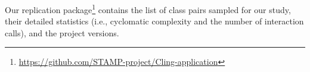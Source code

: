 Our replication package\footnote{\url{https://github.com/STAMP-project/Cling-application}} contains the list of class pairs sampled for our study, their detailed statistics (i.e., cyclomatic complexity and the number of interaction calls), and the project versions.




